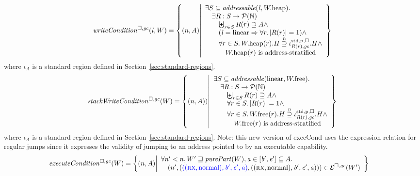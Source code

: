 \documentclass[a4paper]{article}
\begin{document}
\[
  \writeCond{\lin,W} = \left\{ \npair{A} \middle| 
    \begin{array}{l}
      \exists S \subseteq \addressable{\lin, \pwheap} \ldotp \\
      \quad \exists R : S \fun \powerset{\nats} \\
      \qquad \biguplus_{r\in S} R(r) \supseteq A \wedge\\
      \qquad (\lin = \linear \Rightarrow \forall r\ldotp |R(r)|  = 1) \wedge\\
      \qquad \forall r \in S \ldotp \pwheap(r).H \nsupeq \stdreg{R(r),\gc}{\pur}.H \wedge\\
      \qquad \quad \pwheap(r) \text{ is address-stratified}
    \end{array}
  \right\}
\]
where $\iota_A$ is a standard region defined in Section~\ref{sec:standard-regions}.
\[
  \stackWriteCond{W} = \left\{ \npair{A}) \middle| 
    \begin{array}{l}
      \exists S \subseteq \addressable{\linear, \pwfree} \ldotp \\
      \quad \exists R : S \fun \powerset{\nats} \\
      \qquad \biguplus_{r\in S} R(r) \supseteq A \wedge \\
      \qquad \forall r \in S \ldotp |R(r)| = 1 \wedge \\
      \qquad \forall r \in S \ldotp \pwfree(r).H \nsupeq \stdreg{R(r),\gc}{\pur}.H \wedge\\
      \qquad \quad \pwfree(r) \text{ is address-stratified}
    \end{array}
  \right\}
\]
where $\iota_A$ is a standard region defined in Section~\ref{sec:standard-regions}.
Note: this new version of execCond uses the expression relation for regular jumps since it expresses the validity of jumping to an address pointed to by an executable capability. 
\begin{align*}
  \execCond{W} &=
  \left\{ \npair{A} \middle|
    \begin{array}{l}
      \forall n' < n, W' \future \purePart{W}, \aaddr \in [\baddr',\eaddr'] \subseteq A \ldotp\\
      \quad \npair[n']{\stpair[.]{((\rx,\normal),\baddr',\eaddr',\aaddr)}{((\rx,\normal),\baddr',\eaddr',\aaddr)}} \in \lre(W')
    \end{array}
    \right\}
\end{align*}
\end{document}
